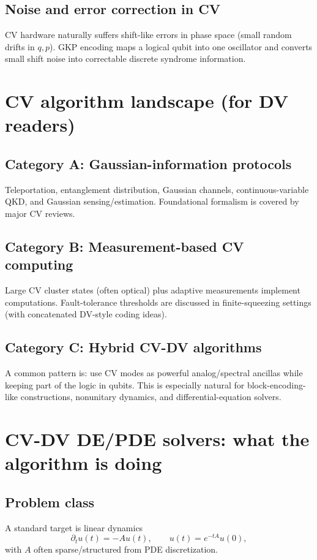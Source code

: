 \documentclass[11pt]{article}
\begin{document}
\subsection{Noise and error correction in CV}
CV hardware naturally suffers shift-like errors in phase space (small random drifts in $q,p$). GKP encoding maps a logical qubit into one oscillator and converts small shift noise into correctable discrete syndrome information.

\section{CV algorithm landscape (for DV readers)}

\subsection{Category A: Gaussian-information protocols}
Teleportation, entanglement distribution, Gaussian channels, continuous-variable QKD, and Gaussian sensing/estimation. Foundational formalism is covered by major CV reviews.

\subsection{Category B: Measurement-based CV computing}
Large CV cluster states (often optical) plus adaptive measurements implement computations. Fault-tolerance thresholds are discussed in finite-squeezing settings (with concatenated DV-style coding ideas).

\subsection{Category C: Hybrid CV-DV algorithms}
A common pattern is: use CV modes as powerful analog/spectral ancillas while keeping part of the logic in qubits. This is especially natural for block-encoding-like constructions, nonunitary dynamics, and differential-equation solvers.

\section{CV-DV DE/PDE solvers: what the algorithm is doing}

\subsection{Problem class}
A standard target is linear dynamics
\begin{equation}
\partial_t u(t) = -A u(t),
\qquad
u(t)=e^{-tA}u(0),
\end{equation}
with $A$ often sparse/structured from PDE discretization.
\end{document}
